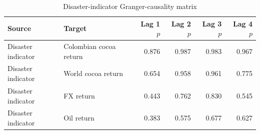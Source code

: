 \begin{table}
\caption{Disaster-indicator Granger-causality matrix}
\label{tab:supp_disaster_granger}
\begin{tabular}{llrrrr}
\toprule
Source & Target & Lag 1 $p$ & Lag 2 $p$ & Lag 3 $p$ & Lag 4 $p$ \\
\midrule
Disaster indicator & Colombian cocoa return & 0.876 & 0.987 & 0.983 & 0.967 \\
Disaster indicator & World cocoa return & 0.654 & 0.958 & 0.961 & 0.775 \\
Disaster indicator & FX return & 0.443 & 0.762 & 0.830 & 0.545 \\
Disaster indicator & Oil return & 0.383 & 0.575 & 0.677 & 0.627 \\
\bottomrule
\end{tabular}
\end{table}
